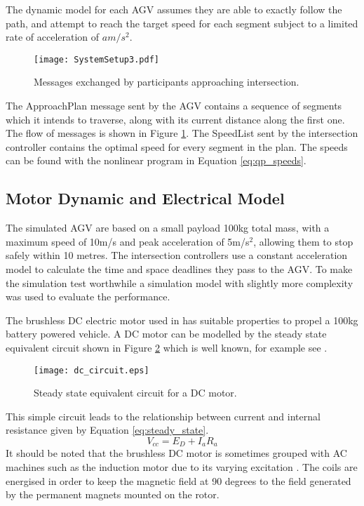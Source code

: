 The dynamic model for each AGV assumes they are able to exactly follow the path, and attempt to reach the target speed for each segment subject to a limited rate of acceleration of $a m/s^2$. 

\begin{figure}[ht]
	\centering
	\texttt{[image: SystemSetup3.pdf]}
	\caption{Messages exchanged by participants approaching intersection.}
	\label{fig:system_setup}
\end{figure}

The ApproachPlan message sent by the AGV contains a sequence of segments which it intends to traverse, along with its current distance along the first one.  The flow of messages is shown in Figure \ref{fig:system_setup}. The SpeedList sent by the intersection controller contains the optimal speed for every segment in the plan. The speeds can be found with the nonlinear program in Equation \ref{eq:qp_speeds}. 

\subsection{Motor Dynamic and Electrical Model}
The simulated AGV are based on a small payload 100kg total mass, with a maximum speed of 10m/s and peak acceleration of 5m/s$^2$, allowing them to stop safely within 10 metres. The intersection controllers use a constant acceleration model to calculate the time and space deadlines they pass to the AGV. To make the simulation test worthwhile a simulation model with slightly more complexity was used to evaluate the performance.


The brushless DC electric motor used in \cite{Racewicz2018} has suitable properties to propel a 100kg battery powered vehicle. A DC motor can be modelled by the steady state equivalent circuit shown in Figure \ref{fig:dc_circuit} which is well known, for example see \cite{Hughes2008}. 

\begin{figure}[ht]
	\centering
	\texttt{[image: dc\_circuit.eps]}
	\caption{Steady state equivalent circuit for a DC motor.}
	\label{fig:dc_circuit}
\end{figure}

This simple circuit leads to the relationship between current and internal resistance given by Equation \ref{eq:steady_state}.
\begin{equation}
	V_{cc} = E_D + I_a R_a
	\label{eq:steady_state}
\end{equation} 
It should be noted that the brushless DC motor is sometimes grouped with AC machines such as the induction motor due to its varying excitation \cite{Sarlioglu2016}. The coils are energised in order to keep the magnetic field at 90 degrees to the field generated by the permanent magnets mounted on the rotor. 

